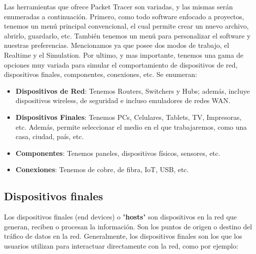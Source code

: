 \documentclass{article}
\begin{document}
Las herramientas que ofrece Packet Tracer son variadas, y las mismas serán enumeradas a continuación. Primero, como todo software enfocado a proyectos, tenemos un menú principal convencional, el cual permite crear un nuevo archivo, abrirlo, guardarlo, etc. También tenemos un menú para personalizar el software y nuestras preferencias. Mencionamos ya que posee dos modos de trabajo, el Realtime y el Simulation. Por ultimo, y mas importante, tenemos una gama de opciones muy variada para simular el comportamiento de dispositivos de red, dispositivos finales, componentes, conexiones, etc. Se enumeran:

\begin{itemize}
    \item \textbf{Dispositivos de Red}: Tenemos Routers, Switchers y Hubs; además, incluye dispositivos wireless, de seguridad e incluso emuladores de redes WAN.
    \item \textbf{Dispositivos Finales}: Tenemos PCs, Celulares, Tablets, TV, Impresoras, etc. Además, permite seleccionar el medio en el que trabajaremos, como una casa, ciudad, país, etc. 
    \item \textbf{Componentes}: Tenemos paneles, dispositivos físicos, sensores, etc. 
    \item \textbf{Conexiones}: Tenemos de cobre, de fibra, IoT, USB, etc.
\end{itemize}



\subsection{Dispositivos finales}
Los dispositivos finales (end devices) o "\textbf{hosts}" son dispositivos en la red que generan, reciben o procesan la información. Son los puntos de origen o destino del tráfico de datos en la red. Generalmente, los dispositivos finales son los que los usuarios utilizan para interactuar directamente con la red, como por ejemplo: 
\end{document}
